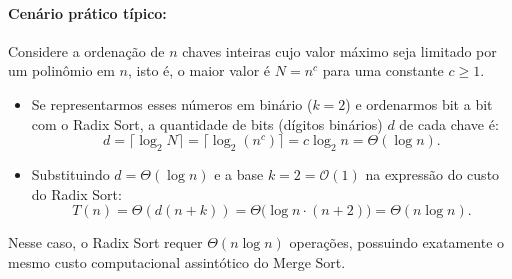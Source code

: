 \documentclass[11pt,a4paper]{article}
\begin{document}
\paragraph{Cenário prático típico:}
Considere a ordenação de $n$ chaves inteiras cujo valor máximo seja limitado por um polinômio em $n$, isto é, o maior valor é $N = n^c$ para uma constante $c \ge 1$.
\begin{itemize}
    \item Se representarmos esses números em binário ($k = 2$) e ordenarmos bit a bit com o Radix Sort, a quantidade de bits (dígitos binários) $d$ de cada chave é:
    \[
        d = \lceil \log_2 N \rceil = \lceil \log_2(n^c) \rceil = c \log_2 n = \Theta(\log n).
    \]
    \item Substituindo $d = \Theta(\log n)$ e a base $k = 2 = \mathcal{O}(1)$ na expressão do custo do Radix Sort:
    \[
        T(n) = \Theta(d(n + k)) = \Theta\big(\log n \cdot (n + 2)\big) = \Theta(n \log n).
    \]
\end{itemize}
Nesse caso, o Radix Sort requer $\Theta(n \log n)$ operações, possuindo exatamente o mesmo custo computacional assintótico do Merge Sort.
\end{document}
